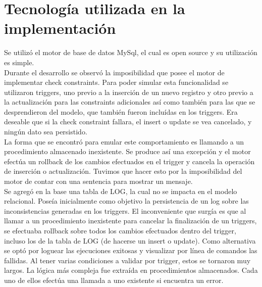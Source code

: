 \documentclass[11pt, a4paper, spanish]{article}
\newenvironment{borde}[1]
{\begin{lrbox}{\fmbox}\begin{minipage}{#1}}
{\end{minipage}\end{lrbox}\fbox{\usebox{\fmbox}}\\[10pt]}
\begin{document}


\newpage 
\section{Tecnolog\'ia utilizada en la implementaci\'on}

    Se utiliz\'o el motor de base de datos MySql, el cual es open source y su utilizaci\'on es simple.\\

    Durante el desarrollo se observ\'o la imposibilidad que posee el motor de implementar check constraints. 
    Para poder simular esta funcionalidad se utilizaron triggers, uno previo a la inserci\'on de un nuevo registro y otro previo a la actualizaci\'on para las constraints adicionales as\'i como tambi\'en para las que se desprendieron del modelo, que tambi\'en fueron inclu\'idas en los triggers.
    Era deseable que si la check constraint fallara, el insert o update se vea cancelado, y ning\'un dato sea persistido.\\

    La forma que se encontr\'o para emular este comportamiento es llamando a un procedimiento almacenado inexistente. 
    Se produce as\'i una excepci\'on y el motor efect\'ua un rollback de los cambios efectuados en el trigger y cancela la operaci\'on de inserci\'on o actualizaci\'on.
    Tuvimos que hacer esto por la imposibilidad del motor de contar con una sentencia para mostrar un mensaje.\\

    Se agreg\'o en la base una tabla de LOG, la cual no se impacta en el modelo relacional. Pose\'ia inicialmente como objetivo la persistencia de un log sobre las inconsistencias generadas en los triggers. El inconveniente que surg\'ia es que al llamar a un procedimiento inexistente para cancelar la finalizaci\'on de un triggers, se efectuaba rollback sobre todos los cambios efectuados dentro del trigger, incluso los de la tabla de LOG (de hacerse un insert o update). Como alternativa se opt\'o por loguear las ejecuciones exitosas y visualizar por l\'inea de comandos las fallidas.
    Al tener varias condiciones a validar por trigger, estos se tornaron muy largos. La l\'ogica m\'as compleja fue extra\'ida en procedimientos almacenados. 
    Cada uno de ellos efect\'ua una llamada a uno existente si encuentra un error.\\
\end{document}
